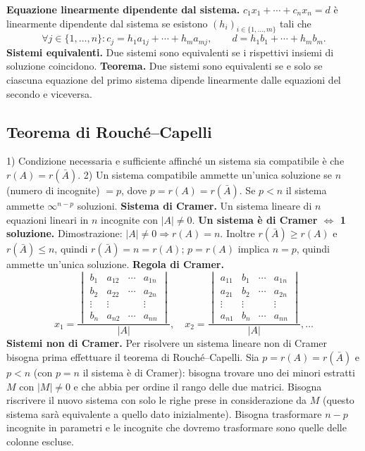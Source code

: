 \documentclass[11pt,a4paper]{article}
\newcommand{\pagina}[1]{\clearpage}
\begin{document}
\textbf{Equazione linearmente dipendente dal sistema.} $c_1x_1+\cdots+c_nx_n=d$ è linearmente dipendente dal sistema se esistono $(h_i)_{i\in\{1,\ldots,m\}}$ tali che
\[\forall j\in\{1,\ldots,n\}:c_j=h_1a_{1j}+\cdots+h_ma_{mj},\qquad d=h_1b_1+\cdots+h_mb_m.\]
\textbf{Sistemi equivalenti.} Due sistemi sono equivalenti se i rispettivi insiemi di soluzione coincidono.
\textbf{Teorema.} Due sistemi sono equivalenti se e solo se ciascuna equazione del primo sistema dipende linearmente dalle equazioni del secondo e viceversa.
\pagina{25}
\subsection*{Teorema di Rouché--Capelli}
1) Condizione necessaria e sufficiente affinché un sistema sia compatibile è che $r(A)=r(\bar A)$.
2) Un sistema compatibile ammette un'unica soluzione se $n$ (numero di incognite) $=p$, dove $p=r(A)=r(\bar A)$. Se $p<n$ il sistema ammette $\infty^{n-p}$ soluzioni.
\textbf{Sistema di Cramer.} Un sistema lineare di $n$ equazioni lineari in $n$ incognite con $|A|\ne0$.
\textbf{Un sistema è di Cramer $\Longleftrightarrow$ 1 soluzione.}
Dimostrazione: $|A|\ne0\Rightarrow r(A)=n$. Inoltre $r(\bar A)\ge r(A)$ e $r(\bar A)\le n$, quindi $r(\bar A)=n=r(A)$; $p=r(A)$ implica $n=p$, quindi ammette un'unica soluzione.
\textbf{Regola di Cramer.}
\[x_1=\frac{\begin{vmatrix}b_1&a_{12}&\cdots&a_{1n}\\b_2&a_{22}&\cdots&a_{2n}\\\vdots&\vdots&&\vdots\\b_n&a_{n2}&\cdots&a_{nn}\end{vmatrix}}{|A|},\quad x_2=\frac{\begin{vmatrix}a_{11}&b_1&\cdots&a_{1n}\\a_{21}&b_2&\cdots&a_{2n}\\\vdots&\vdots&&\vdots\\a_{n1}&b_n&\cdots&a_{nn}\end{vmatrix}}{|A|},\ldots\]
\textbf{Sistemi non di Cramer.} Per risolvere un sistema lineare non di Cramer bisogna prima effettuare il teorema di Rouché--Capelli. Sia $p=r(A)=r(\bar A)$ e $p<n$ (con $p=n$ il sistema è di Cramer): bisogna trovare uno
\pagina{26}
dei minori estratti $M$ con $|M|\ne0$ e che abbia per ordine il rango delle due matrici.
Bisogna riscrivere il nuovo sistema con solo le righe prese in considerazione da $M$ (questo sistema sarà equivalente a quello dato inizialmente). Bisogna trasformare $n-p$ incognite in parametri e le incognite che dovremo trasformare sono quelle delle colonne escluse.
\end{document}

